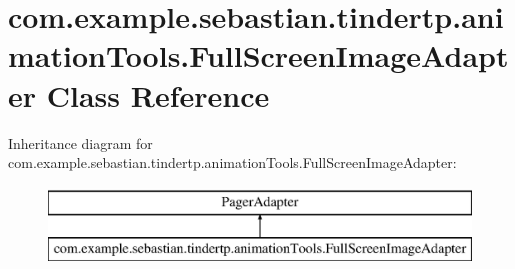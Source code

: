 \hypertarget{classcom_1_1example_1_1sebastian_1_1tindertp_1_1animationTools_1_1FullScreenImageAdapter}{}\section{com.\+example.\+sebastian.\+tindertp.\+animation\+Tools.\+Full\+Screen\+Image\+Adapter Class Reference}
\label{classcom_1_1example_1_1sebastian_1_1tindertp_1_1animationTools_1_1FullScreenImageAdapter}
Inheritance diagram for com.\+example.\+sebastian.\+tindertp.\+animation\+Tools.\+Full\+Screen\+Image\+Adapter\+:\begin{figure}[H]
\begin{center}
\leavevmode
\includegraphics[height=2.000000cm]{classcom_1_1example_1_1sebastian_1_1tindertp_1_1animationTools_1_1FullScreenImageAdapter}
\end{center}
\end{figure}
